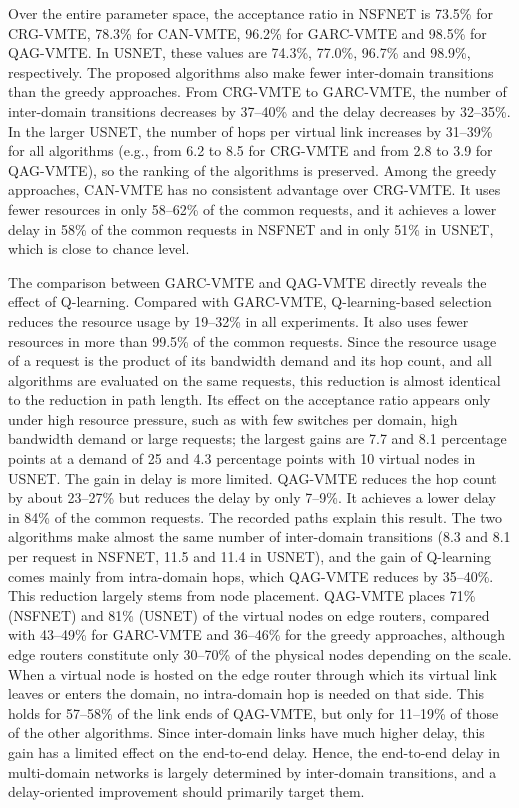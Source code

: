 Over the entire parameter space, the acceptance ratio in NSFNET is 73.5\% for CRG-VMTE, 78.3\% for CAN-VMTE, 96.2\% for GARC-VMTE and 98.5\% for QAG-VMTE. In USNET, these values are 74.3\%, 77.0\%, 96.7\% and 98.9\%, respectively. The proposed algorithms also make fewer inter-domain transitions than the greedy approaches. From CRG-VMTE to GARC-VMTE, the number of inter-domain transitions decreases by 37--40\% and the delay decreases by 32--35\%. In the larger USNET, the number of hops per virtual link increases by 31--39\% for all algorithms (e.g., from 6.2 to 8.5 for CRG-VMTE and from 2.8 to 3.9 for QAG-VMTE), so the ranking of the algorithms is preserved. Among the greedy approaches, CAN-VMTE has no consistent advantage over CRG-VMTE. It uses fewer resources in only 58--62\% of the common requests, and it achieves a lower delay in 58\% of the common requests in NSFNET and in only 51\% in USNET, which is close to chance level.

The comparison between GARC-VMTE and QAG-VMTE directly reveals the effect of Q-learning. Compared with GARC-VMTE, Q-learning-based selection reduces the resource usage by 19--32\% in all experiments. It also uses fewer resources in more than 99.5\% of the common requests. Since the resource usage of a request is the product of its bandwidth demand and its hop count, and all algorithms are evaluated on the same requests, this reduction is almost identical to the reduction in path length. Its effect on the acceptance ratio appears only under high resource pressure, such as with few switches per domain, high bandwidth demand or large requests; the largest gains are 7.7 and 8.1 percentage points at a demand of 25 and 4.3 percentage points with 10 virtual nodes in USNET. The gain in delay is more limited. QAG-VMTE reduces the hop count by about 23--27\% but reduces the delay by only 7--9\%. It achieves a lower delay in 84\% of the common requests. The recorded paths explain this result. The two algorithms make almost the same number of inter-domain transitions (8.3 and 8.1 per request in NSFNET, 11.5 and 11.4 in USNET), and the gain of Q-learning comes mainly from intra-domain hops, which QAG-VMTE reduces by 35--40\%. This reduction largely stems from node placement. QAG-VMTE places 71\% (NSFNET) and 81\% (USNET) of the virtual nodes on edge routers, compared with 43--49\% for GARC-VMTE and 36--46\% for the greedy approaches, although edge routers constitute only 30--70\% of the physical nodes depending on the scale. When a virtual node is hosted on the edge router through which its virtual link leaves or enters the domain, no intra-domain hop is needed on that side. This holds for 57--58\% of the link ends of QAG-VMTE, but only for 11--19\% of those of the other algorithms. Since inter-domain links have much higher delay, this gain has a limited effect on the end-to-end delay. Hence, the end-to-end delay in multi-domain networks is largely determined by inter-domain transitions, and a delay-oriented improvement should primarily target them.
